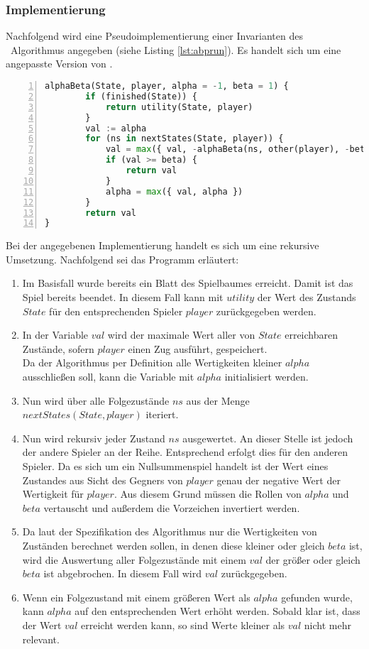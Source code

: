 \subsubsection{Implementierung}
\label{ab-basics-impl}
Nachfolgend wird eine Pseudoimplementierung einer Invarianten des \abab\ Algorithmus angegeben (siehe Listing \ref{lst:abprun}). Es handelt sich um eine angepasste Version von \cite{StroetmannAI19}.
\begin{lstlisting}[caption = {Pseudoimplementierung von \abab}, language = python, captionpos = t , numbers=left, label={lst:abprun}]
alphaBeta(State, player, alpha = -1, beta = 1) {
        if (finished(State)) {
            return utility(State, player)
        }
        val := alpha
        for (ns in nextStates(State, player)) {
            val = max({ val, -alphaBeta(ns, other(player), -beta, -alpha) })
            if (val >= beta) {
                return val
            }
            alpha = max({ val, alpha })
        }
        return val
}
\end{lstlisting}
Bei der angegebenen Implementierung handelt es sich um eine rekursive Umsetzung. Nachfolgend sei das Programm erläutert:
\begin{enumerate}
\item Im Basisfall wurde bereits ein Blatt des Spielbaumes erreicht. Damit ist das Spiel bereits beendet. In diesem Fall kann mit $utility$ der Wert des Zustands $State$ für den entsprechenden Spieler $player$ zurückgegeben werden.
\item In der Variable $val$ wird der maximale Wert aller von $State$ erreichbaren Zustände, sofern $player$ einen Zug ausführt, gespeichert.\\
Da der Algorithmus per Definition alle Wertigkeiten kleiner $alpha$ ausschließen soll, kann die Variable mit $alpha$ initialisiert werden.
\item Nun wird über alle Folgezustände $ns$ aus der Menge $nextStates(State, player)$ iteriert.
\item Nun wird rekursiv jeder Zustand $ns$ ausgewertet. An dieser Stelle ist jedoch der andere Spieler an der Reihe. Entsprechend erfolgt dies für den anderen Spieler. Da es sich um ein Nullsummenspiel handelt ist der Wert eines Zustandes aus Sicht des Gegners von $player$ genau der negative Wert der Wertigkeit für $player$. Aus diesem Grund müssen die Rollen von $alpha$ und $beta$ vertauscht und außerdem die Vorzeichen invertiert werden.
\item Da laut der Spezifikation des Algorithmus nur die Wertigkeiten von Zuständen berechnet werden sollen, in denen diese kleiner oder gleich $beta$ ist, wird die Auswertung aller Folgezustände mit einem $val$ der größer oder gleich $beta$ ist abgebrochen. In diesem Fall wird $val$ zurückgegeben.
\item Wenn ein Folgezustand mit einem größeren Wert als $alpha$ gefunden wurde, kann $alpha$ auf den entsprechenden Wert erhöht werden. Sobald klar ist, dass der Wert $val$ erreicht werden kann, so sind Werte kleiner als $val$ nicht mehr relevant.  
 
\end{enumerate}

